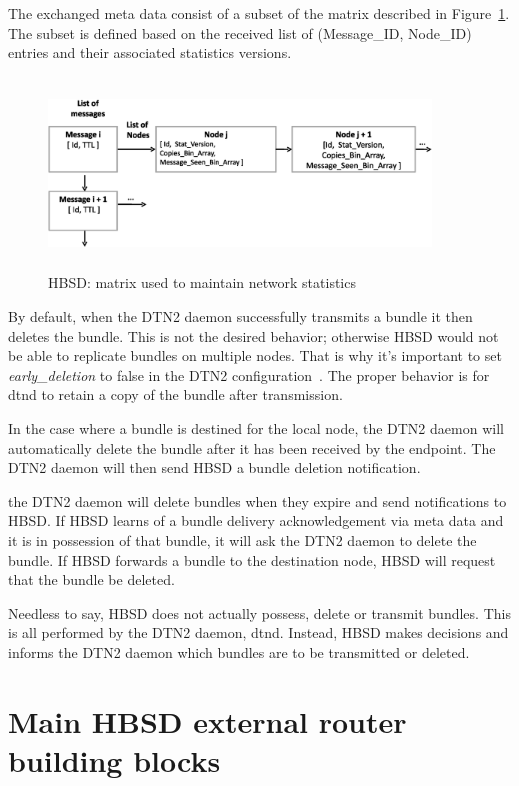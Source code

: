 The exchanged meta data consist of a subset of the matrix described in Figure~\ref{Stat-Mat}. The subset is defined based on the received list of (Message\_ID, Node\_ID) entries and their associated statistics versions.


\begin{figure}[!h]
\centering
\includegraphics[width=4in,height=2in]{Chapitre4/Stat_Matrix.eps}
\caption{HBSD: matrix used to maintain network statistics}
\label{Stat-Mat}
\end{figure}

By default, when the DTN2 daemon successfully transmits a bundle it then deletes the bundle. This is
not the desired behavior; otherwise HBSD would not be able to replicate bundles on
multiple nodes. That is why it's important to set \emph{early\_deletion} to false in the DTN2
configuration~\cite{HBSDDTN2}. The proper behavior is for dtnd to retain a copy of the bundle after
transmission.

In the case where a bundle is destined for the local node, the DTN2 daemon will automatically delete
the bundle after it has been received by the endpoint. The DTN2 daemon will then send HBSD a
bundle deletion notification.

the DTN2 daemon will delete bundles when they expire and send notifications to HBSD.
If HBSD learns of a bundle delivery acknowledgement via meta data and it is in
possession of that bundle, it will ask the DTN2 daemon to delete the bundle.
If HBSD forwards a bundle to the destination node, HBSD will request that the bundle
be deleted.

Needless to say, HBSD does not actually possess, delete or transmit bundles. This is all
performed by the DTN2 daemon, dtnd. Instead, HBSD makes decisions and informs the DTN2 daemon which
bundles are to be transmitted or deleted.


\section{Main HBSD external router building blocks}

